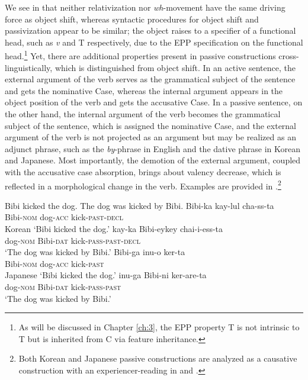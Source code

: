 
We see in  that neither relativization nor \textit{wh}{}-movement have the same driving force as object shift, whereas syntactic procedures for object shift and passivization appear to be similar; the object raises to a specifier of a functional head, such as \textit{v} and T respectively, due to the \ac{EPP} specification on the functional head.\footnote{ \textrm{As will be discussed in Chapter \ref{ch:3}, the \ac{EPP} property T is not intrinsic to T but is inherited from C via feature inheritance.}} Yet, there are additional properties present in passive constructions cross-linguistically, which is distinguished from object shift. In an active sentence, the external argument of the verb serves as the grammatical subject of the sentence and gets the nominative Case, whereas the internal argument appears in the object position of the verb and gets the accusative Case. In a passive sentence, on the other hand, the internal argument of the verb becomes the grammatical subject of the sentence, which is assigned the nominative Case, and the external argument of the verb is not projected as an argument but may be realized as an adjunct phrase, such as the \textit{by}-phrase in English and the dative phrase in Korean and Japanese. Most importantly, the demotion of the external argument, coupled with the accusative case absorption, brings about valency decrease, which is reflected in a morphological change in the verb. Examples are provided in .\footnote{\textrm{Both Korean and Japanese passive constructions are analyzed as a causative construction with an experiencer-reading in \citet{Shim2008} and \citet{ShimNakajima2012}.}}

\ea\label{ex:42}
    \ea\label{ex:42a} Bibi kicked the dog.
     The dog was kicked by Bibi.
    \ex\label{ex:42b} \gll Bibi-ka     kay-lul   cha-ss-ta    \\
   Bibi-\textsc{nom} dog-\textsc{acc} kick-\textsc{past-decl}  \\ \hfill Korean
    \glt  ‘Bibi kicked the dog.’
     \gll kay-ka    Bibi-eykey chai-i-ess-ta \\
      dog-\textsc{nom} Bibi-\textsc{dat}   kick-\textsc{pass-past-decl} \\
    \glt  ‘The dog was kicked by Bibi.’
    \ex\label{ex:42c} \gll Bibi-ga     inu-o      ker-ta   \\
    Bibi-\textsc{nom} dog-\textsc{acc} kick-\textsc{past} \\ \hfill         Japanese
    \glt  ‘Bibi kicked the dog.’
     \gll inu-ga       Bibi-ni   ker-are-ta \\
     dog-\textsc{nom} Bibi-\textsc{dat}   kick-\textsc{pass-past} \\
     \glt  ‘The dog was kicked by Bibi.’
     \z
\z

